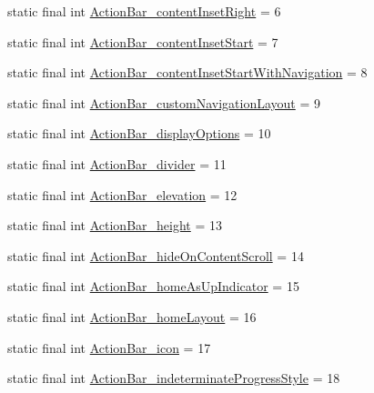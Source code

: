\begin{DoxyCompactItemize}
static final int \mbox{\hyperlink{classcom_1_1google_1_1android_1_1gms_1_1R_1_1styleable_a0741d1e64ead8c780e729b6e98823fcd}{Action\+Bar\+\_\+content\+Inset\+Right}} = 6
\item 
static final int \mbox{\hyperlink{classcom_1_1google_1_1android_1_1gms_1_1R_1_1styleable_a1edfecc9bdd94296e170e4e880890a94}{Action\+Bar\+\_\+content\+Inset\+Start}} = 7
\item 
static final int \mbox{\hyperlink{classcom_1_1google_1_1android_1_1gms_1_1R_1_1styleable_aa346c08cbfaffa565ae78bcbad973ccf}{Action\+Bar\+\_\+content\+Inset\+Start\+With\+Navigation}} = 8
\item 
static final int \mbox{\hyperlink{classcom_1_1google_1_1android_1_1gms_1_1R_1_1styleable_a2ad69bd83e8246c4f23cb6d53463fc18}{Action\+Bar\+\_\+custom\+Navigation\+Layout}} = 9
\item 
static final int \mbox{\hyperlink{classcom_1_1google_1_1android_1_1gms_1_1R_1_1styleable_aff76ff666ca28e945ba999d69bd9a3b2}{Action\+Bar\+\_\+display\+Options}} = 10
\item 
static final int \mbox{\hyperlink{classcom_1_1google_1_1android_1_1gms_1_1R_1_1styleable_a84d052937d8cd57a69eac6837adf5d88}{Action\+Bar\+\_\+divider}} = 11
\item 
static final int \mbox{\hyperlink{classcom_1_1google_1_1android_1_1gms_1_1R_1_1styleable_a3193111c58cf678a3e1dbaad55e1f8dc}{Action\+Bar\+\_\+elevation}} = 12
\item 
static final int \mbox{\hyperlink{classcom_1_1google_1_1android_1_1gms_1_1R_1_1styleable_a77345c18c61f90490924aa83fc58f44f}{Action\+Bar\+\_\+height}} = 13
\item 
static final int \mbox{\hyperlink{classcom_1_1google_1_1android_1_1gms_1_1R_1_1styleable_a43d5d191de2764413906c0695cc8d149}{Action\+Bar\+\_\+hide\+On\+Content\+Scroll}} = 14
\item 
static final int \mbox{\hyperlink{classcom_1_1google_1_1android_1_1gms_1_1R_1_1styleable_a904f5cea51b411b7cd14175c598e5af2}{Action\+Bar\+\_\+home\+As\+Up\+Indicator}} = 15
\item 
static final int \mbox{\hyperlink{classcom_1_1google_1_1android_1_1gms_1_1R_1_1styleable_a0b5315e66d38f5629de036c23961ac27}{Action\+Bar\+\_\+home\+Layout}} = 16
\item 
static final int \mbox{\hyperlink{classcom_1_1google_1_1android_1_1gms_1_1R_1_1styleable_aecd0bb9cf0eea6315d23890e9319a372}{Action\+Bar\+\_\+icon}} = 17
\item 
static final int \mbox{\hyperlink{classcom_1_1google_1_1android_1_1gms_1_1R_1_1styleable_a291cc202401bf220e66c71890e47feb6}{Action\+Bar\+\_\+indeterminate\+Progress\+Style}} = 18

\end{DoxyCompactItemize}
